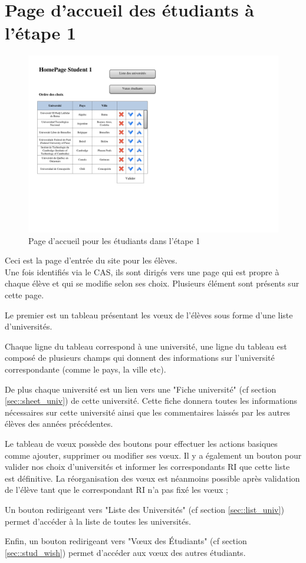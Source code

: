 \section{Page d'accueil des étudiants à l'étape 1}

\begin{figure}[H]
	\includegraphics[scale=1]{Etudiant/HomePageSt1.pdf}
	\caption{Page d'accueil pour les étudiants dans l'étape 1}
\end{figure}

Ceci est la page d'entrée du site pour les élèves.\\
Une fois identifiés via le CAS, ils sont dirigés vers une page qui est propre à chaque élève et qui se modifie selon ses choix.
Plusieurs élément sont présents sur cette page.

\bigbreak

Le premier est un tableau présentant les vœux de l'élèves sous forme d'une liste d'universités.

Chaque ligne du tableau correspond à une université, une ligne du tableau est composé de plusieurs champs qui donnent des informations sur l'université correspondante (comme le pays, la ville etc).

De plus chaque université est un lien vers une "Fiche université" (cf section \ref{sec::sheet_univ}) de cette université. Cette fiche donnera toutes les informations nécessaires sur cette université ainsi que les commentaires laissés par les autres élèves des années précédentes.

Le tableau de vœux possède des boutons pour effectuer les actions basiques comme ajouter, supprimer ou modifier ses vœux. Il y a également un bouton pour valider nos choix d'universités et informer les correspondants RI que cette liste est définitive. La réorganisation des vœux est néanmoins possible après validation de l'élève tant que le correspondant RI n'a pas fixé les vœux ;

\bigbreak

Un bouton redirigeant vers "Liste des Universités" (cf section \ref{sec::list_univ}) permet d'accéder à la liste de toutes les universités.

\bigbreak

Enfin, un bouton redirigeant vers "Vœux des Étudiants" (cf section \ref{sec::stud_wish}) permet d'accéder aux vœux des autres étudiants.
